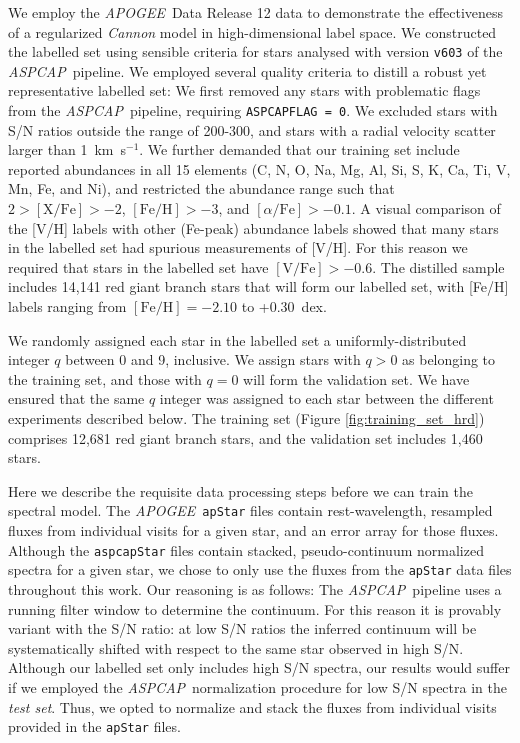 \documentclass[12pt,preprint]{aastex}
\newcommand{\project}[1]{\textsl{#1}}
\newcommand{\acronym}[1]{{\small{#1}}}
\newcommand{\apogee}{\project{\acronym{APOGEE}}}
\newcommand{\aspcap}{\project{\acronym{ASPCAP}}}
\begin{document}
We employ the \apogee\ Data Release 12 data to demonstrate the effectiveness of
a regularized \emph{Cannon} model in high-dimensional label space.  We 
constructed the labelled set using sensible criteria for stars analysed with 
version \texttt{v603} of the \aspcap\ pipeline.  We employed several quality 
criteria to distill a robust yet representative labelled set: We first removed 
any stars with problematic flags from the \aspcap\ pipeline, requiring 
\texttt{ASPCAPFLAG~=~0}.  We excluded stars with S/N ratios outside the range of
200-300, and stars with a radial velocity scatter larger than 1~km~s$^{-1}$.  We
further demanded that our training set include reported abundances in all 15 
elements (C, N, O, Na, Mg, Al, Si, S, K, Ca, Ti, V, Mn, Fe, and Ni), and 
restricted the abundance range such that $2 > \mathrm{[X/Fe]} > -2$, 
$\mathrm{[Fe/H]} > -3$, and $[\alpha/\mathrm{Fe}] > -0.1$.  A visual comparison 
of the [V/H] labels with other (Fe-peak) abundance labels showed that many stars
in the labelled set had spurious measurements of [V/H].  For this reason we 
required that stars in the labelled set have $\mathrm{[V/Fe]} > -0.6$.  The 
distilled sample includes 14,141 red giant branch stars that will form our 
labelled set, with [Fe/H] labels ranging from $\mathrm{[Fe/H]} = -2.10$ to 
+0.30~dex.


We randomly assigned each star in the labelled set a uniformly-distributed 
integer $q$ between 0 and 9, inclusive.  We assign stars with $q > 0$ as 
belonging to the training set, and those with $q = 0$ will form the validation 
set.  We have ensured that the same $q$ integer was assigned to each star 
between the different experiments described below.  The training set (Figure
\ref{fig:training_set_hrd}) comprises 12,681 red giant branch stars, and the 
validation set includes 1,460 stars.


Here we describe the requisite data processing steps before we can train the 
spectral model.  The \apogee\ \texttt{apStar} files contain rest-wavelength, 
resampled fluxes from individual visits for a given star, and an error array for
those fluxes.  Although the \texttt{aspcapStar} files contain stacked, 
pseudo-continuum normalized spectra for a given star, we chose to only use the 
fluxes from the \texttt{apStar} data files throughout this work.  Our reasoning 
is as follows: The \aspcap\ pipeline uses a running filter window to determine 
the continuum.  For this reason it is provably variant with the S/N ratio: at 
low S/N ratios the inferred continuum will be systematically shifted with 
respect to the same star observed in high S/N.  Although our labelled set only 
includes high S/N spectra, our results would suffer if we employed the \aspcap\ 
normalization procedure for low S/N spectra in the \emph{test set}.  Thus, we 
opted to normalize and stack the fluxes from individual visits provided in the 
\texttt{apStar} files.
\end{document}

